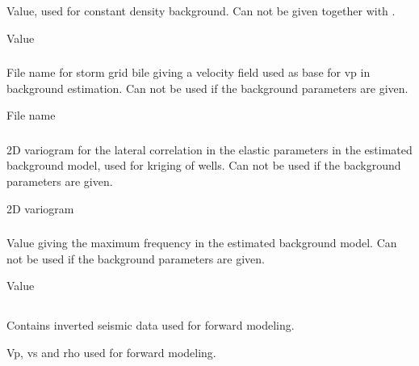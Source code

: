 \subsubsection{}
 \slist
   \item \Description Value, used for constant density background. Can not be given together with .
   \item \Argument Value
   \item \Default
 \elist

\subsubsection{}
 \slist
   \item \Description File name for storm grid bile giving a velocity field used as base for vp in background estimation. Can not be used if the background parameters are given.
   \item \Argument File name
   \item \Default
 \elist

\subsubsection{}
 \slist
   \item \Description 2D variogram for the lateral correlation in the elastic parameters in the estimated background model, used for kriging of wells. Can not be used if the background parameters are given.
   \item \Argument 2D variogram
   \item \Default
 \elist

\subsubsection{}
 \slist
   \item \Description Value giving the maximum frequency in the estimated background model. Can not be used if the background parameters are given.
   \item \Argument Value
   \item \Default
 \elist


\subsection{}
 \slist
   \item \Description Contains inverted seismic data used for forward modeling.
   \item \Argument Vp, vs and rho used for forward modeling.
   \item \Default
 \elist

